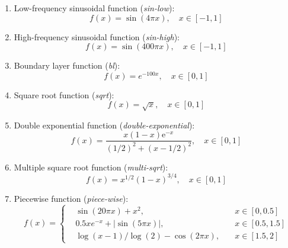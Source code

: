 \begin{enumerate}
    \item Low-frequency sinusoidal function (\textit{sin-low}):
    \begin{equation}
        f(x) = \sin (4\pi x),\quad x\in [-1,1]
    \end{equation}
    
    \item High-frequency sinusoidal function (\textit{sin-high}):
    \begin{equation}
        f(x) = \sin (400\pi x),\quad x\in [-1,1]
    \end{equation}
    
    \item Boundary layer function (\textit{bl}):
    \begin{equation}
        f(x) = e^{-100x},\quad x\in [0,1]
    \end{equation}
    
    \item Square root function (\textit{sqrt}):
    \begin{equation}
        f(x) = \sqrt{x},\quad x\in [0,1]
    \end{equation}
    
    \item Double exponential function (\textit{double-exponential}):
    \begin{equation}
        f(x)=\frac{x(1-x) \mathrm{e}^{-x}}{(1 / 2)^2+(x-1 / 2)^2}, \quad x \in[0,1]
    \end{equation}
    
    \item Multiple square root function (\textit{multi-sqrt}):
    \begin{equation}
        f(x) = x^{1/2}(1-x)^{3/4},\quad x\in [0,1]
    \end{equation}
    
    \item Piecewise function (\textit{piece-wise}):
    \begin{equation}
        f(x)=\left\{
        \begin{aligned}
         & \sin(20 \pi x) + x^2,&\quad x\in [0,0.5] \\
         & 0.5x e^{-x} + |\sin(5\pi x)|,&\quad x\in [0.5,1.5] \\
         & \log (x - 1) / \log(2) - \cos(2  \pi x),&\quad x\in [1.5,2]
        \end{aligned}
        \right.
    \end{equation}
    

\end{enumerate}
